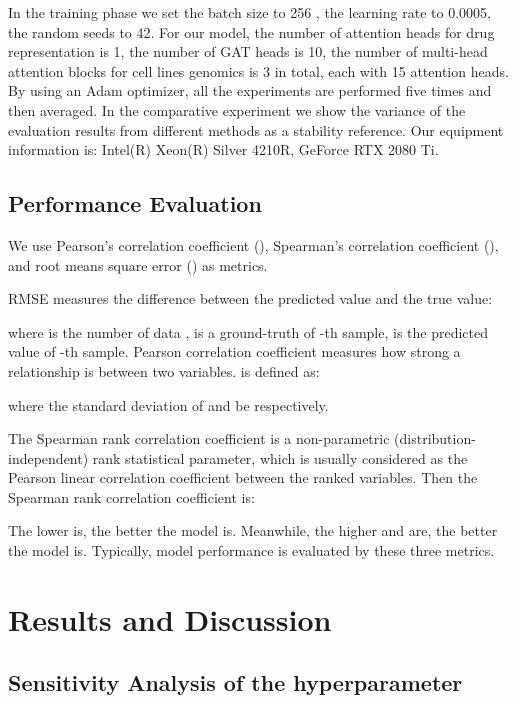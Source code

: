 \documentclass{article}
\begin{document}
In the training phase we set the batch size to 256 , the learning rate to 0.0005, the random seeds to 42. For our model, the number of attention heads for drug representation is 1, the number of GAT heads is 10, the number of  multi-head attention blocks for cell lines genomics is 3 in total, each with 15 attention heads. By using an Adam optimizer, all the experiments are performed five times and then averaged. In the comparative experiment we show the variance of the evaluation results from different methods as a stability reference. Our equipment information is: Intel(R) Xeon(R) Silver 4210R, GeForce RTX 2080 Ti.



\subsection{Performance Evaluation}

We use   Pearson's correlation coefficient (),  Spearman's correlation coefficient (), and root means square error () as metrics.
 
 RMSE measures the difference between the predicted value and the true value:




\noindent where  is the number of data ,  is a ground-truth of -th sample,  is the predicted value of -th sample. Pearson correlation coefficient measures how strong a relationship is between two variables.  is defined as:


\noindent where the standard deviation of  and  be   respectively.

The Spearman rank correlation coefficient is a non-parametric (distribution-independent) rank statistical parameter, which is usually considered as the Pearson linear correlation coefficient between the ranked variables. Then the Spearman rank correlation coefficient is:




 The lower  is, the better the model is. Meanwhile, the higher  and  are, the better the model is. Typically, model performance is evaluated by these three metrics.




\section{Results and Discussion}

\subsection{Sensitivity Analysis of the hyperparameter}
\end{document}
